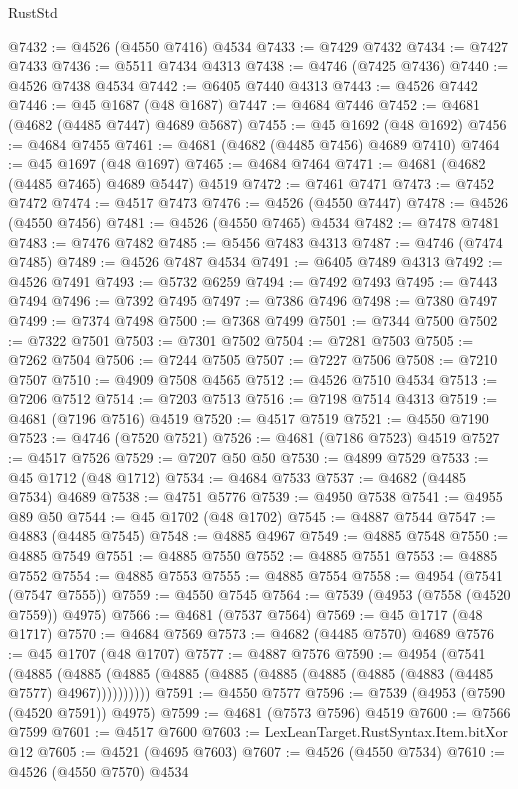 \begin{lexlean}{RustStd}
\begin{coremodule}
@7432 := @4526 (@4550 @7416) @4534
@7433 := @7429 @7432
@7434 := @7427 @7433
@7436 := @5511 @7434 @4313
@7438 := @4746 (@7425 @7436)
@7440 := @4526 @7438 @4534
@7442 := @6405 @7440 @4313
@7443 := @4526 @7442
@7446 := @45 @1687 (@48 @1687)
@7447 := @4684 @7446
@7452 := @4681 (@4682 (@4485 @7447) @4689 @5687)
@7455 := @45 @1692 (@48 @1692)
@7456 := @4684 @7455
@7461 := @4681 (@4682 (@4485 @7456) @4689 @7410)
@7464 := @45 @1697 (@48 @1697)
@7465 := @4684 @7464
@7471 := @4681 (@4682 (@4485 @7465) @4689 @5447) @4519
@7472 := @7461 @7471
@7473 := @7452 @7472
@7474 := @4517 @7473
@7476 := @4526 (@4550 @7447)
@7478 := @4526 (@4550 @7456)
@7481 := @4526 (@4550 @7465) @4534
@7482 := @7478 @7481
@7483 := @7476 @7482
@7485 := @5456 @7483 @4313
@7487 := @4746 (@7474 @7485)
@7489 := @4526 @7487 @4534
@7491 := @6405 @7489 @4313
@7492 := @4526 @7491
@7493 := @5732 @6259
@7494 := @7492 @7493
@7495 := @7443 @7494
@7496 := @7392 @7495
@7497 := @7386 @7496
@7498 := @7380 @7497
@7499 := @7374 @7498
@7500 := @7368 @7499
@7501 := @7344 @7500
@7502 := @7322 @7501
@7503 := @7301 @7502
@7504 := @7281 @7503
@7505 := @7262 @7504
@7506 := @7244 @7505
@7507 := @7227 @7506
@7508 := @7210 @7507
@7510 := @4909 @7508 @4565
@7512 := @4526 @7510 @4534
@7513 := @7206 @7512
@7514 := @7203 @7513
@7516 := @7198 @7514 @4313
@7519 := @4681 (@7196 @7516) @4519
@7520 := @4517 @7519
@7521 := @4550 @7190
@7523 := @4746 (@7520 @7521)
@7526 := @4681 (@7186 @7523) @4519
@7527 := @4517 @7526
@7529 := @7207 @50 @50
@7530 := @4899 @7529
@7533 := @45 @1712 (@48 @1712)
@7534 := @4684 @7533
@7537 := @4682 (@4485 @7534) @4689
@7538 := @4751 @5776
@7539 := @4950 @7538
@7541 := @4955 @89 @50
@7544 := @45 @1702 (@48 @1702)
@7545 := @4887 @7544
@7547 := @4883 (@4485 @7545)
@7548 := @4885 @4967
@7549 := @4885 @7548
@7550 := @4885 @7549
@7551 := @4885 @7550
@7552 := @4885 @7551
@7553 := @4885 @7552
@7554 := @4885 @7553
@7555 := @4885 @7554
@7558 := @4954 (@7541 (@7547 @7555))
@7559 := @4550 @7545
@7564 := @7539 (@4953 (@7558 (@4520 @7559)) @4975)
@7566 := @4681 (@7537 @7564)
@7569 := @45 @1717 (@48 @1717)
@7570 := @4684 @7569
@7573 := @4682 (@4485 @7570) @4689
@7576 := @45 @1707 (@48 @1707)
@7577 := @4887 @7576
@7590 := @4954
    (@7541
      (@4885 (@4885 (@4885 (@4885 (@4885 (@4885 (@4885 (@4885 (@4883 (@4485 @7577) @4967))))))))))
@7591 := @4550 @7577
@7596 := @7539 (@4953 (@7590 (@4520 @7591)) @4975)
@7599 := @4681 (@7573 @7596) @4519
@7600 := @7566 @7599
@7601 := @4517 @7600
@7603 := LexLeanTarget.RustSyntax.Item.bitXor @12
@7605 := @4521 (@4695 @7603)
@7607 := @4526 (@4550 @7534)
@7610 := @4526 (@4550 @7570) @4534

\end{coremodule}
\end{lexlean}
